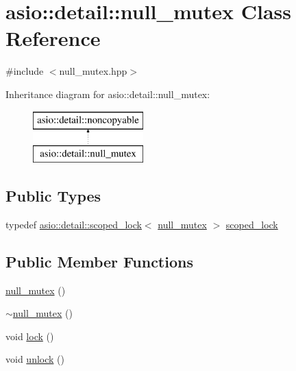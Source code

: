 \hypertarget{classasio_1_1detail_1_1null__mutex}{}\section{asio\+:\+:detail\+:\+:null\+\_\+mutex Class Reference}
\label{classasio_1_1detail_1_1null__mutex}


{\ttfamily \#include $<$null\+\_\+mutex.\+hpp$>$}

Inheritance diagram for asio\+:\+:detail\+:\+:null\+\_\+mutex\+:\begin{figure}[H]
\begin{center}
\leavevmode
\includegraphics[height=2.000000cm]{classasio_1_1detail_1_1null__mutex}
\end{center}
\end{figure}
\subsection*{Public Types}
\begin{DoxyCompactItemize}
\item 
typedef \hyperlink{classasio_1_1detail_1_1scoped__lock}{asio\+::detail\+::scoped\+\_\+lock}$<$ \hyperlink{classasio_1_1detail_1_1null__mutex}{null\+\_\+mutex} $>$ \hyperlink{classasio_1_1detail_1_1null__mutex_a2cee63c1e6051f9c6a361e9b6da8f6f7}{scoped\+\_\+lock}
\end{DoxyCompactItemize}
\subsection*{Public Member Functions}
\begin{DoxyCompactItemize}
\item 
\hyperlink{classasio_1_1detail_1_1null__mutex_a1a0e783cee676626663715d7dd310bf2}{null\+\_\+mutex} ()
\item 
\hyperlink{classasio_1_1detail_1_1null__mutex_a00cfcd33e85458e41b83cbf96713c066}{$\sim$null\+\_\+mutex} ()
\item 
void \hyperlink{classasio_1_1detail_1_1null__mutex_aaccd3af9a4c17678aa29d9c840b81b72}{lock} ()
\item 
void \hyperlink{classasio_1_1detail_1_1null__mutex_aa5658c0da6d8e1a3c11998fdf0e96f22}{unlock} ()
\end{DoxyCompactItemize}


